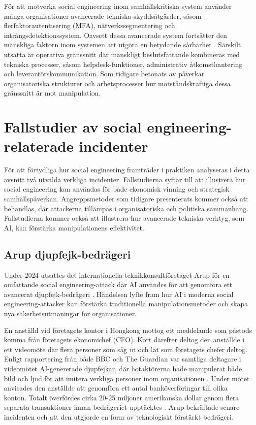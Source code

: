 För att motverka social engineering inom samhällskritiska system använder många organisationer avancerade tekniska skyddsåtgärder, såsom flerfaktorautentisering (MFA), 
nätverkssegmentering och intrångsdetektionssystem. Oavsett dessa avancerade system fortsätter den mänskliga faktorn inom systemen att utgöra en betydande sårbarhet \cite{washo2021interdisciplinary, albladi2018defense_mechanisms}. 
Särskilt utsatta är operativa gränssnitt där mänskligt beslutsfattande kombineras med tekniska processer, såsom helpdesk-funktioner, administrativ åtkomsthantering och leverantörskommunikation. 
Som tidigare betonats av \cite{washo2021interdisciplinary, enisa2018cybersecurity_culture} påverkar organisatoriska strukturer och arbetsprocesser hur motståndskraftiga dessa gränssnitt är mot manipulation. 

\section{Fallstudier av social engineering-relaterade incidenter}
För att förtydliga hur social engineering framträder i praktiken analyseras i detta avsnitt två utvalda verkliga incidenter. Fallstudierna syftar till att illustrera hur social engineering kan 
användas för både ekonomisk vinning och strategisk samhällspåverkan. Angreppsmetoder som tidigare presenterats kommer också att behandlas, där attackerna tillämpas i organisatoriska och politiska sammanhang. 
Fallstudierna kommer också att illustrera hur avancerade tekniska verktyg, som AI, kan förstärka manipulationens effektivitet.

\subsection{Arup djupfejk-bedrägeri}
Under 2024 utsattes det internationella teknikkonsultföretaget Arup för en omfattande social engineering-attack där AI användes för att genomföra ett avancerat djupfejk-bedrägeri \cite{guardian_arup_2024, bbc_arup_2024}. 
Händelsen lyfte fram hur AI i moderna social engineering-attacker kan förstärka traditionella manipulationsmetoder och skapa nya säkerhetsutmaningar för organisationer.

En anställd vid företagets kontor i Hongkong mottog ett meddelande som påstods komma från företagets ekonomichef (CFO). Kort därefter deltog den anställde i ett videomöte där flera personer som såg ut 
och lät som företagets chefer deltog. Enligt rapportering från både BBC och The Guardian var samtliga deltagare i videomötet AI-genererade djupfejkar, där hotaktörerna hade manipulerat både bild och ljud 
för att imitera verkliga personer inom organisationen \cite{guardian_arup_2024, bbc_arup_2024}. Under mötet anvisades den anställde att genomföra ett antal banköverföringar till olika konton. 
Totalt överfördes cirka 20-25 miljoner amerikanska dollar genom flera separata transaktioner innan bedrägeriet upptäcktes \cite{guardian_arup_2024, bbc_arup_2024}. 
Arup bekräftade senare incidenten och att den utgjorde en form av teknologiskt förstärkt bedrägeri.

